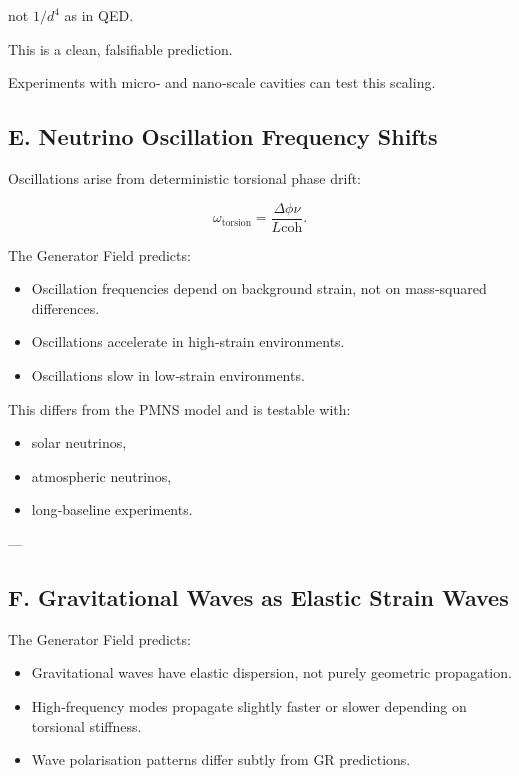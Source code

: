 \documentclass[reprint,amsmath,amssymb,aps,prl,floatfix]{revtex4-2}
\begin{document}
\begin{itemize}
not \(1/d^4\) as in QED.

This is a clean, falsifiable prediction.

Experiments with micro‑ and nano‑scale cavities can test this scaling.

\subsection{E. Neutrino Oscillation Frequency Shifts}

Oscillations arise from deterministic torsional phase drift:

\[
\omega_{\mathrm{torsion}}
=
\frac{\Delta\phi\nu}{L{\mathrm{coh}}}.
\]

The Generator Field predicts:

\begin{itemize}
\item Oscillation frequencies depend on background strain, not on mass‑squared differences.  
\item Oscillations accelerate in high‑strain environments.  
\item Oscillations slow in low‑strain environments.
\end{itemize}

This differs from the PMNS model and is testable with:

\begin{itemize}
\item solar neutrinos,  
\item atmospheric neutrinos,  
\item long‑baseline experiments.
\end{itemize}

---

\subsection{F. Gravitational Waves as Elastic Strain Waves}

The Generator Field predicts:

\begin{itemize}
\item Gravitational waves have elastic dispersion, not purely geometric propagation.  
\item High‑frequency modes propagate slightly faster or slower depending on torsional stiffness.  
\item Wave polarisation patterns differ subtly from GR predictions.
\end{itemize}


\end{itemize}
\end{document}
